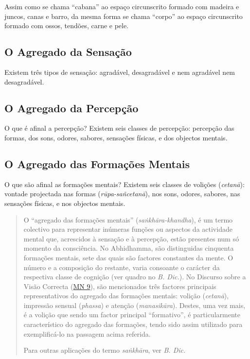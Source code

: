 Assim como se chama ``cabana'' ao espaço circunscrito formado com madeira e
juncos, canas e barro, da mesma forma se chama ``corpo'' ao espaço circunscrito
formado com ossos, tendões, carne e pele.


\subsection{O Agregado da Sensação}


Existem três tipos de sensação: agradável, desagradável e nem agradável nem
desagradável.


\subsection{O Agregado da Percepção}


O que é afinal a percepção? Existem seis classes de percepção: percepção das
formas, dos sons, odores, sabores, sensações físicas, e dos objectos mentais.

\subsection{O Agregado das Formações Mentais}


O que são afinal as formações mentais? Existem seis classes de volições
(\emph{cetanā}): vontade projectada nas formas (\emph{rūpa-sañcetanā}), nos
sons, odores, sabores, nas sensações físicas, e nos objectos mentais.


\clearpage

\begin{quote}
  O ``agregado das formações mentais'' (\emph{sa\.{n}khāra-khandha}), é um termo
  colectivo para representar inúmeras funções ou aspectos da actividade mental
  que, acrescidos à sensação e à percepção, estão presentes num só momento da
  consciência. No Abhidhamma, são distinguidas cinquenta formações mentais, sete
  das quais são factores constantes da mente. O número e a composição do
  restante, varia consoante o carácter da respectiva classe de cognição (ver
  quadro no \emph{B. Dic.}). No Discurso sobre a Visão Correcta (\href{https://suttacentral.net/mn9/en/bodhi}{MN 9}),
  são mencionados três factores principais representativos do agregado das
  formações mentais: volição (\emph{cetanā}), impressão sensual (\emph{phassa})
  e atenção (\emph{manasikāra}). Destes, uma vez mais, é a volição que sendo um
  factor principal ``formativo'', é particularmente característico do agregado
  das formações, tendo sido assim utilizado para exemplificá-lo na passagem
  acima referida.

  Para outras aplicações do termo \emph{sa\.{n}khāra}, ver \emph{B. Dic.}
\end{quote}

